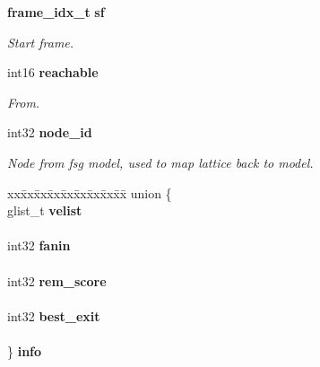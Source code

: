 \begin{DoxyCompactItemize}
\textbf{ frame\+\_\+idx\+\_\+t} \textbf{ sf}
\begin{DoxyCompactList}\small\item\em Start frame. \end{DoxyCompactList}\item 
int16 \textbf{ reachable}
\begin{DoxyCompactList}\small\item\em From. \end{DoxyCompactList}\item 
\mbox{\label{structps__latnode__s_a50d14c033652a4fb387f76881df1c3f6}} 
int32 \textbf{ node\+\_\+id}
\begin{DoxyCompactList}\small\item\em Node from fsg model, used to map lattice back to model. \end{DoxyCompactList}\item 
\mbox{\label{structps__latnode__s_a08268f9ec02dc27bead7ad7524838969}} 
\begin{tabbing}
xx\=xx\=xx\=xx\=xx\=xx\=xx\=xx\=xx\=\kill
union \{\\
\>glist\_t \textbf{ velist}\\
\>\\
\>int32 \textbf{ fanin}\\
\>\\
\>int32 \textbf{ rem\_score}\\
\>\\
\>int32 \textbf{ best\_exit}\\
\>\\
\} {\bfseries info}\\


\end{tabbing}
\end{DoxyCompactItemize}
